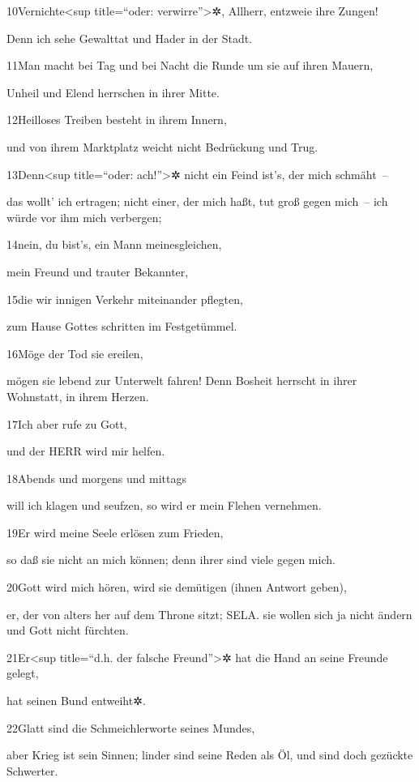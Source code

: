 10Vernichte\textless sup title=``oder: verwirre''\textgreater✲, Allherr,
entzweie ihre Zungen!

Denn ich sehe Gewalttat und Hader in der Stadt.

11Man macht bei Tag und bei Nacht die Runde um sie auf ihren Mauern,

Unheil und Elend herrschen in ihrer Mitte.

12Heilloses Treiben besteht in ihrem Innern,

und von ihrem Marktplatz weicht nicht Bedrückung und Trug.

13Denn\textless sup title=``oder: ach!''\textgreater✲ nicht ein Feind
ist's, der mich schmäht~--

das wollt' ich ertragen; nicht einer, der mich haßt, tut groß gegen
mich~-- ich würde vor ihm mich verbergen;

14nein, du bist's, ein Mann meinesgleichen,

mein Freund und trauter Bekannter,

15die wir innigen Verkehr miteinander pflegten,

zum Hause Gottes schritten im Festgetümmel.

16Möge der Tod sie ereilen,

mögen sie lebend zur Unterwelt fahren! Denn Bosheit herrscht in ihrer
Wohnstatt, in ihrem Herzen.

17Ich aber rufe zu Gott,

und der HERR wird mir helfen.

18Abends und morgens und mittags

will ich klagen und seufzen, so wird er mein Flehen vernehmen.

19Er wird meine Seele erlösen zum Frieden,

so daß sie nicht an mich können; denn ihrer sind viele gegen mich.

20Gott wird mich hören, wird sie demütigen (ihnen Antwort geben),

er, der von alters her auf dem Throne sitzt; SELA. sie wollen sich ja
nicht ändern und Gott nicht fürchten.

21Er\textless sup title=``d.h. der falsche Freund''\textgreater✲ hat die
Hand an seine Freunde gelegt,

hat seinen Bund entweiht✲.

22Glatt sind die Schmeichlerworte seines Mundes,

aber Krieg ist sein Sinnen; linder sind seine Reden als Öl, und sind
doch gezückte Schwerter.

